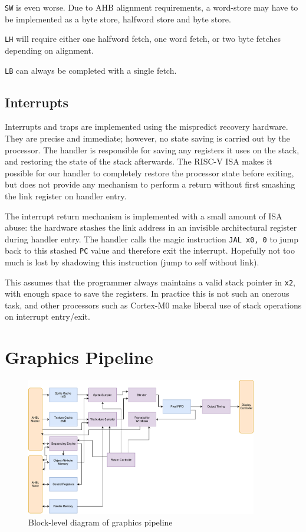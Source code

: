 \documentclass{article}
\begin{document}
\texttt{SW} is even worse. Due to AHB alignment requirements, a word-store may have to be implemented as a byte store, halfword store and byte store.

\texttt{LH} will require either one halfword fetch, one word fetch, or two byte fetches depending on alignment.

\texttt{LB} can always be completed with a single fetch.



\subsection{Interrupts}

Interrupts and traps are implemented using the mispredict recovery hardware. They are precise and immediate; however, no state saving is carried out by the processor. The handler is responsible for saving any registers it uses on the stack, and restoring the state of the stack afterwards. The RISC-V ISA makes it possible for our handler to completely restore the processor state before exiting, but does not provide any mechanism to perform a return without first smashing the link register on handler entry.

The interrupt return mechanism is implemented with a small amount of ISA abuse: the hardware stashes the link address in an invisible architectural register during handler entry. The handler calls the magic instruction \texttt{JAL x0, 0} to jump back to this stashed \texttt{PC} value and therefore exit the interrupt. Hopefully not too much is lost by shadowing this instruction (jump to self without link).

This assumes that the programmer always maintains a valid stack pointer in \texttt{x2}, with enough space to save the registers. In practice this is not such an onerous task, and other processors such as Cortex-M0 make liberal use of stack operations on interrupt entry/exit.

\section{Graphics Pipeline}

\begin{figure}[!htb]
\centering
\caption{Block-level diagram of graphics pipeline}
\includegraphics[width=0.9\textwidth]{diagrams/graphics.pdf}
\end{figure}
\end{document}
